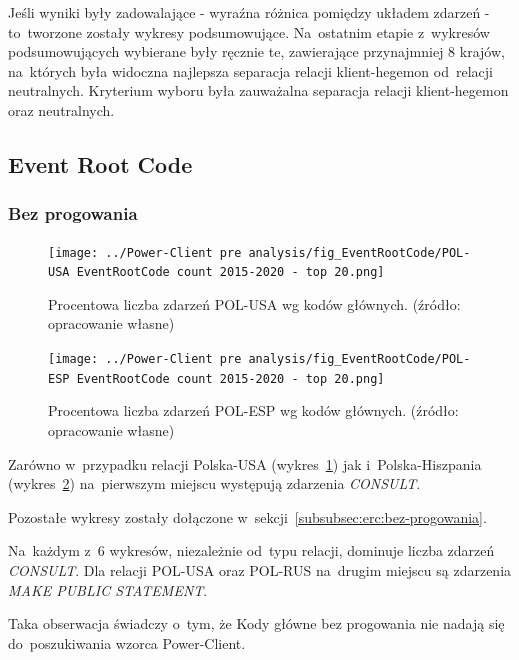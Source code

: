 \documentclass[11pt]{report}
\begin{document}
    Jeśli wyniki były zadowalające - wyraźna różnica pomiędzy układem zdarzeń - to~tworzone zostały wykresy podsumowujące.
    Na~ostatnim etapie z~wykresów podsumowujących wybierane były ręcznie te, zawierające przynajmniej 8 krajów, na~których była widoczna najlepsza separacja relacji klient-hegemon od~relacji neutralnych.
    Kryterium wyboru była zauważalna separacja relacji klient-hegemon oraz neutralnych.

    \subsection{Event Root Code}\label{subsec:event-root-code}

    \subsubsection{Bez progowania}

    \begin{figure}[tp]
        \centering
        \texttt{[image: ../Power-Client pre analysis/fig\_EventRootCode/POL-USA EventRootCode count 2015-2020 - top 20.png]}
        \caption{Procentowa liczba zdarzeń POL-USA wg kodów głównych. (źródło: opracowanie własne)}
        \label{fig:Power-Client:ERC:POL-USA}
    \end{figure}

    \begin{figure}[tp]
        \centering
        \texttt{[image: ../Power-Client pre analysis/fig\_EventRootCode/POL-ESP EventRootCode count 2015-2020 - top 20.png]}
        \caption{Procentowa liczba zdarzeń POL-ESP wg kodów głównych. (źródło: opracowanie własne)}
        \label{fig:Power-Client:ERC:POL-ESP}
    \end{figure}

    Zarówno w~przypadku relacji Polska-USA (wykres~\ref{fig:Power-Client:ERC:POL-USA}) jak i~Polska-Hiszpania (wykres~\ref{fig:Power-Client:ERC:POL-ESP})
    na~pierwszym miejscu występują zdarzenia \textit{CONSULT}.

    Pozostałe wykresy zostały dołączone w~sekcji~\ref{subsubsec:erc:bez-progowania}.

    Na~każdym z~6 wykresów, niezależnie od~typu relacji, dominuje liczba zdarzeń \textit{CONSULT}.
    Dla relacji POL-USA oraz POL-RUS na~drugim miejscu są zdarzenia \textit{MAKE PUBLIC STATEMENT}.

    Taka obserwacja świadczy o~tym, że Kody główne bez progowania nie nadają się do~poszukiwania wzorca Power-Client.
\end{document}
